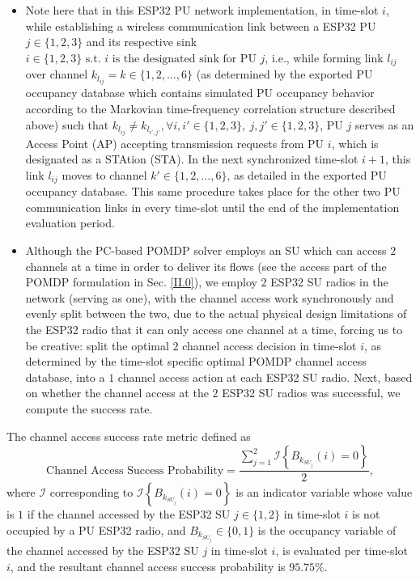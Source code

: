 \documentclass[12pt, draftcls, onecolumn]{IEEEtran}
\begin{document}
\begin{itemize}
    \item Note here that in this ESP32 PU network implementation, in time-slot $i$, while establishing a wireless communication link between a ESP32 PU $j{\in}\{1,2,3\}$ and its respective sink $i{\in}\{1,2,3\}\text{ s.t. }i\text{ is the designated sink for PU }j$, i.e., while forming link $l_{ij}$ over channel $k_{l_{ij}}{=}k{\in}\{1,2,\dots,6\}$ (as determined by the exported PU occupancy database which contains simulated PU occupancy behavior according to the Markovian time-frequency correlation structure described above) such that $k_{l_{ij}}{\neq}k_{l_{i',j'}},{\forall}i,i'{\in}\{1,2,3\},\ j,j'{\in}\{1,2,3\}$, PU $j$ serves as an Access Point (AP) accepting transmission requests from PU $i$, which is designated as a STAtion (STA). In the next synchronized time-slot $i+1$, this link $l_{ij}$ moves to channel $k'{\in}\{1,2,\dots,6\}$, as detailed in the exported PU occupancy database. This same procedure takes place for the other two PU communication links in every time-slot until the end of the implementation evaluation period.
    \item Although the PC-based POMDP solver employs an SU which can access $2$ channels at a time in order to deliver its flows (see the access part of the POMDP formulation in Sec. \ref{II.0}), we employ $2$ ESP32 SU radios in the network (serving as one), with the channel access work synchronously and evenly split between the two, due to the actual physical design limitations of the ESP32 radio that it can only access one channel at a time, forcing us to be creative: split the optimal $2$ channel access decision in time-slot $i$, as determined by the time-slot specific optimal POMDP channel access database, into a $1$ channel access action at each ESP32 SU radio. Next, based on whether the channel access at the $2$ ESP32 SU radios was successful, we compute the success rate.
\end{itemize}
The channel access success rate metric defined as
\begin{equation}\label{C.I}
    \text{Channel Access Success Probability}=\frac{\sum_{j=1}^{2}\mathcal{I}\left\{B_{k_{SU_{j}}}(i)=0\right\}}{2},
\end{equation}
where $\mathcal{I}$ corresponding to $\mathcal{I}\left\{B_{k_{SU_{j}}}(i)=0\right\}$ is an indicator variable whose value is $1$ if the channel accessed by the ESP32 SU $j{\in}\{1,2\}$ in time-slot $i$ is not occupied by a PU ESP32 radio, and $B_{k_{SU_{j}}}{\in}\{0,1\}$ is the occupancy variable of the channel accessed by the ESP32 SU $j$ in time-slot $i$, is evaluated per time-slot $i$, and the resultant channel access success probability is $95.75$\%.
\end{document}
